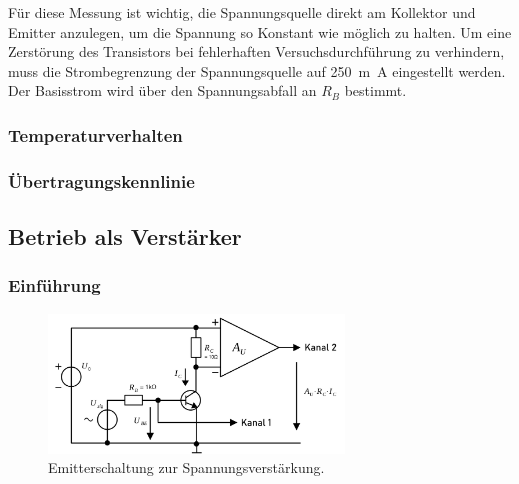 \documentclass[
	a4paper, %
	12pt, %
]{CSUniSchoolLabReport}
\newcommand{\milli}{m}
\begin{document}
Für diese Messung ist wichtig, die Spannungsquelle direkt am Kollektor und Emitter anzulegen, um die Spannung so Konstant wie möglich zu halten.
Um eine Zerstörung des Transistors bei fehlerhaften Versuchsdurchführung zu verhindern, muss die Strombegrenzung der Spannungsquelle auf \SI{250}{\milli\ampere} eingestellt werden. 
Der Basisstrom wird über den Spannungsabfall an $R_B$ bestimmt. 
\subsubsection{Temperaturverhalten}
\subsubsection{Übertragungskennlinie}

\subsection{Betrieb als Verstärker}
\subsubsection{Einführung}
\begin{figure}[h]
	\centering
	\includegraphics[width=0.7\textwidth]{Figures/Messschaltung B.1.4..png}
	\caption{Emitterschaltung zur Spannungsverstärkung.}
	\label{fig:Messschaltung B.1.4.}
\end{figure}
\end{document}
